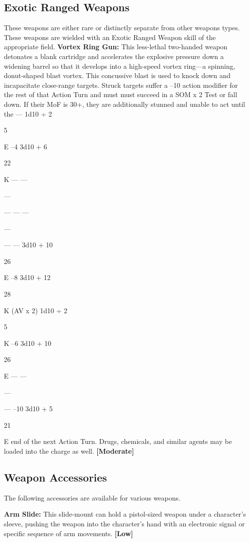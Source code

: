 \subsection{Exotic Ranged Weapons}

These weapons are either rare or distinctly separate 
from other weapons types. These weapons are wielded 
with an Exotic Ranged Weapon skill of the appropriate
field.
\textbf{Vortex Ring Gun:} This less-lethal two-handed 
weapon detonates a blank cartridge and accelerates 
the explosive pressure down a widening barrel so that 
it develops into a high-speed vortex ring—a spinning, 
donut-shaped blast vortex. This concussive blast is 
used to knock down and incapacitate close-range 
targets. Struck targets suffer a –10 action modifier for 
the rest of that Action Turn and must must succeed in 
a SOM x 2 Test or fall down. If their MoF is 30+, they 
are additionally stunned and unable to act until the 
—
1d10 ÷ 2

5

E
–4
3d10 + 6

22

K
—
—

—

—
—
—

—

—
—
3d10 + 10 

26

E
–8
3d10 + 12

28

K
(AV x 2)
1d10 ÷ 2 

5

K
–6
3d10 + 10

26

E
—
—

—

—
–10
3d10 + 5

21

E
end of the next Action Turn. Drugs, chemicals, and 
similar agents may be loaded into the charge as well. 
\textbf{[Moderate]}

\subsection{Weapon Accessories}

The following accessories are available for various 
weapons.

\textbf{Arm Slide:} This slide-mount can hold a pistol-sized
weapon under a character's sleeve, pushing the
weapon into the character's hand with an electronic 
signal or specific sequence of arm movements. \textbf{[Low]}


